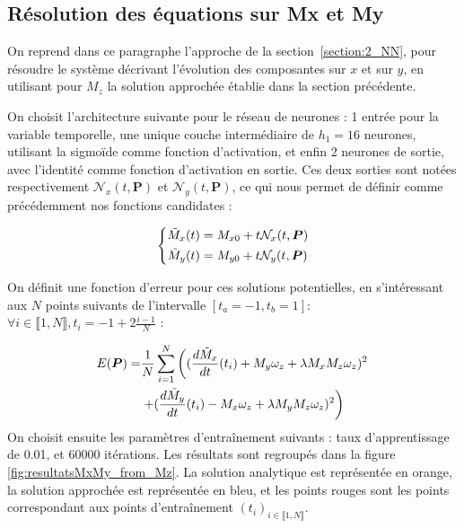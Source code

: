 \documentclass[12pt]{report}
\begin{document}
\subsection{Résolution des équations sur Mx et My}
\label{section:Mx_My_from_Mz}

On reprend dans ce paragraphe l'approche de la section~\ref{section:2_NN}, pour résoudre le système décrivant l'évolution des composantes sur $x$ et sur $y$, en utilisant pour $M_z$ la solution approchée établie dans la section précédente.

On choisit l'architecture suivante pour le réseau de neurones : 
1 entrée pour la variable temporelle, une unique couche intermédiaire de $h_1=16$ neurones, utilisant la sigmoïde comme fonction d'activation, et enfin 2 neurones de sortie, avec l'identité comme fonction d'activation en sortie.
Ces deux sorties sont notées respectivement $\mathcal{N}_x(t, \bm{P})$ et $\mathcal{N}_y(t, \bm{P})$, ce qui nous permet de définir comme précédemment nos fonctions candidates :

\begin{equation}
    \left\{
        \begin{aligned}
            \Tilde{M}_x(t) &= M_{x0} + t\mathcal{N}_x(t, \bm{P}) \\
            \Tilde{M}_y(t) &= M_{y0} + t\mathcal{N}_y(t, \bm{P})
        \end{aligned}
    \right.
    \label{eq:solution_Mx_My_from M_z}
\end{equation}

On définit une fonction d'erreur pour ces solutions potentielles, en s'intéressant aux $N$ points suivants de l'intervalle $[t_a=-1, t_b=1]$: 
$\forall i \in\llbracket 1,N \rrbracket, t_i = -1 + 2\frac{i-1}{N} $ :

\begin{equation}
    \begin{aligned}
        E(\bm{P})=&\frac{1}{N}\sum_{i=1}^{N}\left((\frac{d\Tilde{M}_x}{dt}(t_i) + M_y\omega_z + \lambda M_x M_z \omega_z)^2\right.\\
        &\left.+(\frac{d\Tilde{M}_y}{dt}(t_i) -M_x\omega_z + \lambda M_y M_z \omega_z)^2\right)
    \end{aligned}
    \label{eq:erreur_Mx_My_from_Mz}
\end{equation}
On choisit ensuite les paramètres d'entraînement suivants : taux d'apprentissage de 0.01, et 60000 itérations.
Les résultats sont regroupés dans la figure \ref{fig:resultatsMxMy_from_Mz}.
La solution analytique est représentée en orange, la solution approchée est représentée en bleu, et les points rouges sont les points correspondant aux points d'entraînement $(t_i)_{i \in \llbracket 1, N \rrbracket}$.
\end{document}
